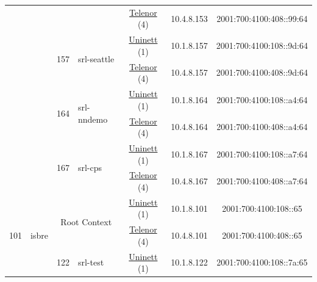 \begin{small}
\begin{center}
\begin{longtable}{|c|c|c|c|c|c|c|c|}
  &  &  &  & \multicolumn{2}{|c|}{\tiny{\href{https://www.telenor.no}{Telenor} (4)}} & \tiny{10.4.8.153} & \tiny{2001:700:4100:408::99:64} \\* \cline{3-3}\cline{4-4}\cline{5-5}\cline{6-6}\cline{7-7}\cline{8-8}
  &  & \multirow{2}{*}{\tiny{157}} & \multicolumn{1}{|l|}{\multirow{2}{*}{\tiny{srl-seattle}}} & \multicolumn{2}{|c|}{\tiny{\href{https://www.uninett.no}{Uninett} (1)}} & \tiny{10.1.8.157} & \tiny{2001:700:4100:108::9d:64} \\* \cline{5-5}\cline{6-6}\cline{7-7}\cline{8-8}
  &  &  &  & \multicolumn{2}{|c|}{\tiny{\href{https://www.telenor.no}{Telenor} (4)}} & \tiny{10.4.8.157} & \tiny{2001:700:4100:408::9d:64} \\* \cline{3-3}\cline{4-4}\cline{5-5}\cline{6-6}\cline{7-7}\cline{8-8}
  &  & \multirow{2}{*}{\tiny{164}} & \multicolumn{1}{|l|}{\multirow{2}{*}{\tiny{srl-nndemo}}} & \multicolumn{2}{|c|}{\tiny{\href{https://www.uninett.no}{Uninett} (1)}} & \tiny{10.1.8.164} & \tiny{2001:700:4100:108::a4:64} \\* \cline{5-5}\cline{6-6}\cline{7-7}\cline{8-8}
  &  &  &  & \multicolumn{2}{|c|}{\tiny{\href{https://www.telenor.no}{Telenor} (4)}} & \tiny{10.4.8.164} & \tiny{2001:700:4100:408::a4:64} \\* \cline{3-3}\cline{4-4}\cline{5-5}\cline{6-6}\cline{7-7}\cline{8-8}
  &  & \multirow{2}{*}{\tiny{167}} & \multicolumn{1}{|l|}{\multirow{2}{*}{\tiny{srl-cps}}} & \multicolumn{2}{|c|}{\tiny{\href{https://www.uninett.no}{Uninett} (1)}} & \tiny{10.1.8.167} & \tiny{2001:700:4100:108::a7:64} \\* \cline{5-5}\cline{6-6}\cline{7-7}\cline{8-8}
  &  &  &  & \multicolumn{2}{|c|}{\tiny{\href{https://www.telenor.no}{Telenor} (4)}} & \tiny{10.4.8.167} & \tiny{2001:700:4100:408::a7:64} \\ \hline
 \multirow{24}{*}{\tiny{101}} & \multicolumn{1}{|l|}{\multirow{24}{*}{\tiny{isbre}}} & \multicolumn{2}{|c|}{\multirow{2}{*}{\tiny{Root Context}}} & \multicolumn{2}{|c|}{\tiny{\href{https://www.uninett.no}{Uninett} (1)}} & \tiny{10.1.8.101} & \tiny{2001:700:4100:108::65} \\* \cline{5-5}\cline{6-6}\cline{7-7}\cline{8-8}
  &  & \multicolumn{2}{|c|}{} & \multicolumn{2}{|c|}{\tiny{\href{https://www.telenor.no}{Telenor} (4)}} & \tiny{10.4.8.101} & \tiny{2001:700:4100:408::65} \\* \cline{3-3}\cline{4-4}\cline{5-5}\cline{6-6}\cline{7-7}\cline{8-8}
  &  & \multirow{2}{*}{\tiny{122}} & \multicolumn{1}{|l|}{\multirow{2}{*}{\tiny{srl-test}}} & \multicolumn{2}{|c|}{\tiny{\href{https://www.uninett.no}{Uninett} (1)}} & \tiny{10.1.8.122} & \tiny{2001:700:4100:108::7a:65} \\* \cline{5-5}\cline{6-6}\cline{7-7}\cline{8-8}

\end{longtable}
\end{center}
\end{small}
